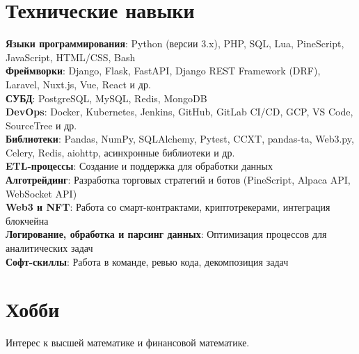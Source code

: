 \documentclass[letterpaper,11pt]{article}
\begin{document}
\section{Технические навыки}
\begin{itemize}[leftmargin=0.15in, label={}]
    \small{\item{
        \textbf{Языки программирования}{: Python (версии 3.x), PHP, SQL, Lua, PineScript, JavaScript, HTML/CSS, Bash} \\
        \textbf{Фреймворки}{: Django, Flask, FastAPI, Django REST Framework (DRF), Laravel, Nuxt.js, Vue, React и др.} \\
        \textbf{СУБД}{: PostgreSQL, MySQL, Redis, MongoDB} \\
        \textbf{DevOps}{: Docker, Kubernetes, Jenkins, GitHub, GitLab CI/CD, GCP, VS Code, SourceTree и др.} \\
        \textbf{Библиотеки}{: Pandas, NumPy, SQLAlchemy, Pytest, CCXT, pandas-ta, Web3.py, Celery, Redis, aiohttp, асинхронные библиотеки и др.} \\
        \textbf{ETL-процессы}{: Создание и поддержка для обработки данных} \\
        \textbf{Алготрейдинг}{: Разработка торговых стратегий и ботов (PineScript, Alpaca API, WebSocket API)} \\
        \textbf{Web3 и NFT}{: Работа со смарт-контрактами, криптотрекерами, интеграция блокчейна} \\
        \textbf{Логирование, обработка и парсинг данных}{: Оптимизация процессов для аналитических задач} \\
        \textbf{Софт-скиллы}{: Работа в команде, ревью кода, декомпозиция задач}
    }}
\end{itemize}
\section{Хобби}
\begin{itemize}[leftmargin=0.15in, label={}]
    \small{\item{
        Интерес к высшей математике и финансовой математике.
    }}
\end{itemize}
\end{document}
